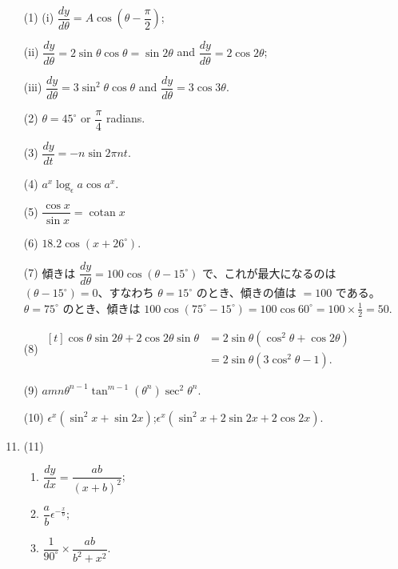\documentclass[a4paper,11pt,openany]{ltjsbook}
\DeclareMathOperator{\cotan}{cotan}
\begin{document}
\begin{enumerate}
\item[(1)] (i) $\dfrac{dy}{d\theta} = A \cos \left( \theta - \dfrac{\pi}{2} \right)$;

(ii) $\dfrac{dy}{d\theta} = 2\sin\theta \cos\theta = \sin2\theta$ and $\dfrac{dy}{d\theta} = 2\cos2\theta$;

(iii) $\dfrac{dy}{d\theta} = 3\sin^2 \theta \cos\theta$ and $\dfrac{dy}{d\theta} = 3\cos3\theta$.

\item[(2)]  $\theta = 45^\circ$ or $\dfrac{\pi}{4}$ radians.

\item[(3)]  $\dfrac{dy}{dt} = -n \sin 2\pi nt$.

\item[(4)]  $a^x \log_\epsilon a \cos a^x$.

\item[(5)]  $\dfrac{\cos x}{\sin x} = \cotan x$

\item[(6)]  $18.2 \cos \left(x + 26^\circ \right)$.

\item[(7)] { 傾きは $\dfrac{dy}{d\theta} = 100\cos\left(\theta - 15^\circ \right)$ で、これが最大になるのは
$(\theta -15^\circ) = 0$、すなわち $\theta = 15^\circ$ のとき、傾きの値は ${}= 100$ である。$\theta = 75^\circ$ のとき、傾きは
 $100\cos(75^\circ  - 15^\circ) = 100\cos 60^\circ = 100 \times  \frac{1}{2} = 50$.}

\item[(8)] $\begin{aligned}[t]
  \cos\theta \sin2\theta + 2\cos2\theta \sin\theta
  &= 2\sin\theta\left(\cos^2 \theta + \cos2\theta\right) \\
  &= 2\sin\theta\left(3\cos^2 \theta - 1\right).
  \end{aligned}$

\item[(9)] $amn\theta^{n-1} \tan^{m-1}\left(\theta^n\right)\sec^2 \theta^n$.

\item[(10)] $\epsilon^x \left(\sin^2 x + \sin2x\right)$;\quad $\epsilon^x \left(\sin^2 x + 2\sin2x + 2\cos2x\right)$.

\item (11) \begin{enumerate}[label=(\roman*)]
    \item $\dfrac{dy}{dx} = \dfrac{ab}{(x + b)^2}$;
    \item $\dfrac{a}{b} \epsilon^{-\frac{x}{b}}$;
    \item $\dfrac{1}{90^\circ} \times \dfrac{ab}{b^2 + x^2}$.
\end{enumerate}


\end{enumerate}
\end{document}
